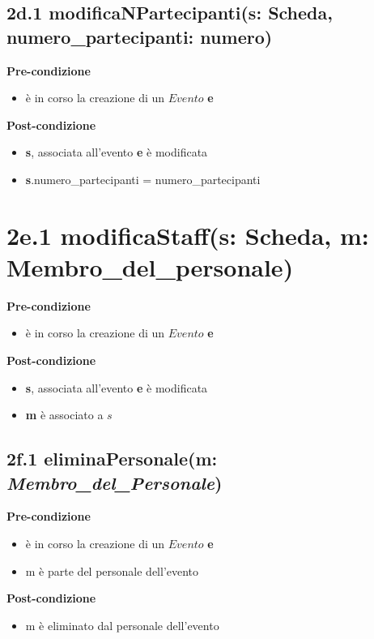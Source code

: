 \documentclass[12pt]{extarticle}
\begin{document}
\subsection*{2d.1 modificaNPartecipanti(s: Scheda, numero\_partecipanti: numero)}

\textbf{Pre-condizione}
\begin{itemize}
  \item è in corso la creazione di un $Evento$ \textbf{e}
\end{itemize} 
\textbf{Post-condizione}
\begin{itemize}
  \item \textbf{s}, associata all'evento \textbf{e} è modificata
  \item \textbf{s}.numero\_partecipanti = numero\_partecipanti
\end{itemize} 

\section*{2e.1 modificaStaff(s: Scheda, m: Membro\_del\_personale)}

\textbf{Pre-condizione}
\begin{itemize}
  \item è in corso la creazione di un $Evento$ \textbf{e}
\end{itemize}
\textbf{Post-condizione}
\begin{itemize}
  \item \textbf{s}, associata all'evento \textbf{e} è modificata
  \item \textbf{m} è associato a $s$
\end{itemize}

\subsection*{2f.1 eliminaPersonale(m: \textit{Membro\_del\_Personale})}

\textbf{Pre-condizione}
\begin{itemize}
  \item è in corso la creazione di un $Evento$ \textbf{e}
  \item m è parte del personale dell'evento
\end{itemize}
\textbf{Post-condizione}
\begin{itemize}
  \item m è eliminato dal personale dell'evento
\end{itemize}
\end{document}
